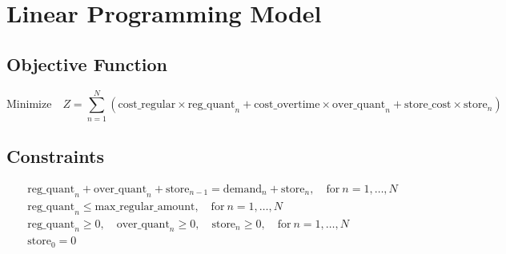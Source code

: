 \documentclass{article}
\begin{document}
\section*{Linear Programming Model}

\subsection*{Objective Function}

\[
\text{Minimize} \quad Z = \sum_{n=1}^{N} \left( \text{cost\_regular} \times \text{reg\_quant}_n + \text{cost\_overtime} \times \text{over\_quant}_n + \text{store\_cost} \times \text{store}_n \right)
\]

\subsection*{Constraints}

\begin{align*}
& \text{reg\_quant}_n + \text{over\_quant}_n + \text{store}_{n-1} = \text{demand}_n + \text{store}_n, \quad \text{for} \ n = 1, \ldots, N \\
& \text{reg\_quant}_n \leq \text{max\_regular\_amount}, \quad \text{for} \ n = 1, \ldots, N \\
& \text{reg\_quant}_n \geq 0, \quad \text{over\_quant}_n \geq 0, \quad \text{store}_n \geq 0, \quad \text{for} \ n = 1, \ldots, N \\
& \text{store}_0 = 0
\end{align*}
\end{document}
